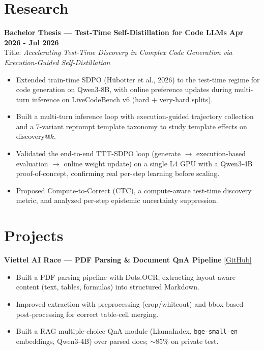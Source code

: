 \documentclass[a4paper,10pt]{article}
\begin{document}
\section{Research}

\noindent\textbf{Bachelor Thesis --- Test-Time Self-Distillation for Code LLMs} \hfill \textbf{Apr 2026 - Jul 2026} \\
\quad Title: \textit{Accelerating Test-Time Discovery in Complex Code Generation via Execution-Guided Self-Distillation} \\
\vspace{-0.3em}
\begin{itemize}[leftmargin=1.2em, itemsep=0.05em, parsep=0pt, topsep=0pt]
    \item Extended train-time SDPO (Hübotter et al., 2026) to the test-time regime for code generation on Qwen3-8B, with online preference updates during multi-turn inference on LiveCodeBench v6 (hard + very-hard splits).
    \item Built a multi-turn inference loop with execution-guided trajectory collection and a 7-variant reprompt template taxonomy to study template effects on discovery@$k$.
    \item Validated the end-to-end TTT-SDPO loop (generate $\rightarrow$ execution-based evaluation $\rightarrow$ online weight update) on a single L4 GPU with a Qwen3-4B proof-of-concept, confirming real per-step learning before scaling.
    \item Proposed Compute-to-Correct (CTC), a compute-aware test-time discovery metric, and analyzed per-step epistemic uncertainty suppression.
\end{itemize}

\section{Projects}

\noindent\textbf{Viettel AI Race --- PDF Parsing \& Document QnA Pipeline} \hfill \href{https://github.com/theAbyssOfTime2004/Viettel-AI-Race}{\color{darkblue}[GitHub]} \\
\vspace{-1.1em}
\begin{itemize}[leftmargin=1.2em, itemsep=0.05em, parsep=0pt]
  \item Built a PDF parsing pipeline with Dots.OCR, extracting layout-aware content (text, tables, formulas) into structured Markdown.
  \item Improved extraction with preprocessing (crop/whiteout) and bbox-based post-processing for correct table-cell merging.
  \item Built a RAG multiple-choice QnA module (LlamaIndex, \texttt{bge-small-en} embeddings, Qwen3-4B) over parsed docs; $\sim$85\% on private test.
\end{itemize}
\end{document}
